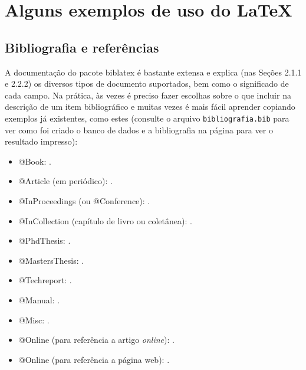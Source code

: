 
\chapter{Alguns exemplos de uso do \LaTeX{}}
\label{chap:exemplos}

\section{Bibliografia e referências}

A documentação do pacote biblatex \citep{biblatex} é
bastante extensa e explica (nas Seções 2.1.1 e 2.2.2) os diversos
tipos de documento suportados, bem como o significado de cada campo.
Na prática, às vezes é preciso fazer escolhas sobre
o que incluir na descrição de um item bibliográfico e muitas vezes
é mais fácil aprender copiando exemplos já existentes, como estes (consulte o
arquivo \texttt{bibliografia.bib} para ver como foi criado o banco de dados e a
bibliografia na página \pageref{bibliografia} para ver o resultado impresso):

\begin{multicols}{2}
  \begin{itemize}
    \item @Book: \cite{Knuth:96}.

    \item @Article (em periódico): \cite{floats2014}.

    \item @InProceedings (ou @Conference): \cite{alves03:simi}.

    \item @InCollection (capítulo de livro ou coletânea): \cite{bobaoglu93:concepts}.

    \item @PhdThesis: \cite{garcia01:PhD}.

    \item @MastersThesis: \cite{schmidt03:MSc}.

    \item @Techreport: \cite{alvisi99:analysisCIC}.

    \item @Manual: \cite{biblatex}.

    \item @Misc: \cite{gridftp}.

    \item @Online (para referência a artigo \emph{online}): \cite{fowler04:designDead}.

    \item @Online (para referência a página web): \cite{FSF:GNU-GPL}.
  \end{itemize}
\end{multicols}

